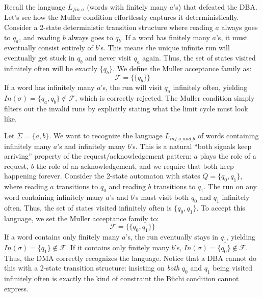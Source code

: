 
\begin{example}
Recall the language $L_{fin\_a}$ (words with finitely many $a$'s) that defeated the DBA. Let's see how the Muller condition effortlessly captures it deterministically.
Consider a 2-state deterministic transition structure where reading $a$ always goes to $q_a$, and reading $b$ always goes to $q_b$. 
If a word has finitely many $a$'s, it must eventually consist entirely of $b$'s. This means the unique infinite run will eventually get stuck in $q_b$ and never visit $q_a$ again. Thus, the set of states visited infinitely often will be exactly $\{q_b\}$.
We define the Muller acceptance family as:
$$\mathcal{F} = \{ \{q_b\} \}$$
If a word has infinitely many $a$'s, the run will visit $q_a$ infinitely often, yielding $In(\sigma) = \{q_a, q_b\} \notin \mathcal{F}$, which is correctly rejected. The Muller condition simply filters out the invalid runs by explicitly stating what the limit cycle must look like.
\end{example}

\begin{example}
Let $\Sigma = \{a, b\}$. We want to recognize the language $L_{inf\_a\_and\_b}$ of words containing infinitely many $a$'s and infinitely many $b$'s. This is a natural ``both signals keep arriving'' property of the request/acknowledgement pattern: $a$ plays the role of a request, $b$ the role of an acknowledgement, and we require that both keep happening forever.
Consider the 2-state automaton with states $Q = \{q_0, q_1\}$, where reading $a$ transitions to $q_0$ and reading $b$ transitions to $q_1$.
The run on any word containing infinitely many $a$'s and $b$'s must visit both $q_0$ and $q_1$ infinitely often. Thus, the set of states visited infinitely often is $\{q_0, q_1\}$.
To accept this language, we set the Muller acceptance family to:
$$\mathcal{F} = \{ \{q_0, q_1\} \}$$
If a word contains only finitely many $a$'s, the run eventually stays in $q_1$, yielding $In(\sigma) = \{q_1\} \notin \mathcal{F}$. If it contains only finitely many $b$'s, $In(\sigma) = \{q_0\} \notin \mathcal{F}$. Thus, the DMA correctly recognizes the language. Notice that a DBA cannot do this with a 2-state transition structure: insisting on \emph{both} $q_0$ and $q_1$ being visited infinitely often is exactly the kind of constraint the Büchi condition cannot express.
\end{example}

